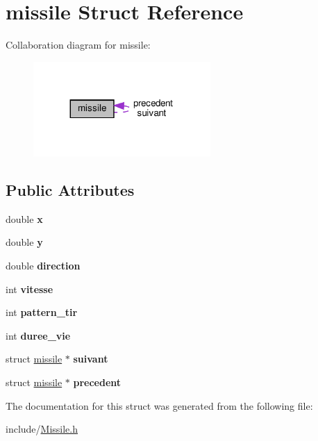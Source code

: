 \hypertarget{structmissile}{}\section{missile Struct Reference}
\label{structmissile}


Collaboration diagram for missile\+:
\nopagebreak
\begin{figure}[H]
\begin{center}
\leavevmode
\includegraphics[width=191pt]{structmissile__coll__graph}
\end{center}
\end{figure}
\subsection*{Public Attributes}
\begin{DoxyCompactItemize}
\item 
\mbox{\label{structmissile_ab1423402eeeb3d35ff9cd65c4d44e3bd}} 
double {\bfseries x}
\item 
\mbox{\label{structmissile_ac2e0c2053decacf0d3dfd3848687e9d7}} 
double {\bfseries y}
\item 
\mbox{\label{structmissile_af2c63079877a6d3ee129a7fd5f3603f8}} 
double {\bfseries direction}
\item 
\mbox{\label{structmissile_a5d19670ce606f5fdc5c7e88172754959}} 
int {\bfseries vitesse}
\item 
\mbox{\label{structmissile_a1650d99c72d536a17b3072071b842981}} 
int {\bfseries pattern\+\_\+tir}
\item 
\mbox{\label{structmissile_a8e75aab961776134040144240cbae188}} 
int {\bfseries duree\+\_\+vie}
\item 
\mbox{\label{structmissile_a783964f4325ba99c5a3c74cdf7741c3d}} 
struct \hyperlink{structmissile}{missile} $\ast$ {\bfseries suivant}
\item 
\mbox{\label{structmissile_af9cf5327b6f90e18c0eb405618e74adf}} 
struct \hyperlink{structmissile}{missile} $\ast$ {\bfseries precedent}
\end{DoxyCompactItemize}


The documentation for this struct was generated from the following file\+:\begin{DoxyCompactItemize}
\item 
include/\hyperlink{_missile_8h}{Missile.\+h}\end{DoxyCompactItemize}
